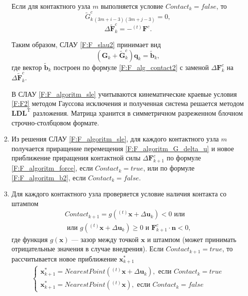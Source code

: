 \documentclass[]{article}
\begin{document}
\begin{enumerate}
	Если для контактного узла $m$ выполняется условие $Contact_k=false$, то
	\begin{equation}
	\tilde{G}_{k\,(3m+i-3)(3m+j-3)}^{c}=0,
	\label{F:F_algoritm_G2}
	\end{equation}
	\begin{equation}
	\Delta\tilde{\mathbf{F}}_k^c=-{}^{(t)}\mathbf{F}^c.
	\label{F:F_algoritm_b2}
	\end{equation}
	
	Таким образом, СЛАУ \eqref{F:F_slau2} принимает вид
	\begin{equation}
	\left(\mathbf{G}_k+\tilde{\mathbf{G}}_k^c\right)\mathbf{q}_k=\tilde{\mathbf{b}}_k,
	\label{F:F_algoritm_sle}
	\end{equation}
	где вектор $\tilde{\mathbf{b}}_k$ построен по формуле \eqref{F:F_alg_contact2} с заменой $\Delta\mathbf{F}_k^c$ на $\Delta\tilde{\mathbf{F}}_k^c$.
	
	В СЛАУ \eqref{F:F_algoritm_sle} учитываются кинематические краевые условия \eqref{F:F2} методом Гауссова исключения и полученная система решается методом $\mathbf{LDL}^{\mathrm{T}}$ разложения. Матрица хранится в симметричном разреженном блочном строчно-столбцовом формате.
	
	\item
	Из решения СЛАУ \eqref{F:F_algoritm_sle}, для каждого контактного узла $m$ получается приращение перемещения \eqref{F:F_algoritm_G_delta_u} и новое приближение приращения контактной силы $\Delta\mathbf{F}_{k+1}^{c}$ по формуле \eqref{F:F_algoritm_force}, если $Contact_k=true$, или по формуле \eqref{F:F_algoritm_b2}, если $Contact_k=false$.
	
	\item
	Для каждого контактного узла проверяется условие наличия контакта со штампом
	\begin{equation}
	\begin{gathered}
	Contact_{k+1}=g\left({}^{(t)}\mathbf{x}+\Delta\mathbf{u}_k\right)<0 \mbox{ или }\\
	\mbox{ или } g\left({}^{(t)}\mathbf{x}+\Delta\mathbf{u}_k\right)\geqslant 0 \mbox{ и } \mathbf{F}_{k+1}^{c}\cdot \mathbf{n}<0,
	\label{F:F_algoritm_contact_condition}
	\end{gathered}
	\end{equation}
	где функция $g\left(\mathbf{x}\right)$ --- зазор между точкой $\mathbf{x}$ и штампом (может принимать отрицательные значения в случае внедрения). Если $Contact_{k+1}=true$, то рассчитывается новое приближение $\mathbf{x}_{k+1}^*$
	\begin{equation}
	\begin{gathered}
	\begin{cases}
	\mathbf{x}_{k+1}^*=NearestPoint\left({}^{(t)}\mathbf{x}+\Delta\mathbf{u}_k\right),\mbox{ если }Contact_k=true\\
	\mathbf{x}_{k+1}^*=NearestPoint\left({}^{(t)}\mathbf{x}\right),\mbox{ если }Contact_k=false
	\end{cases}\\
	\end{gathered}
	\label{F:F_algoritm_contact_new}
	\end{equation}
	

\end{enumerate}
\end{document}
